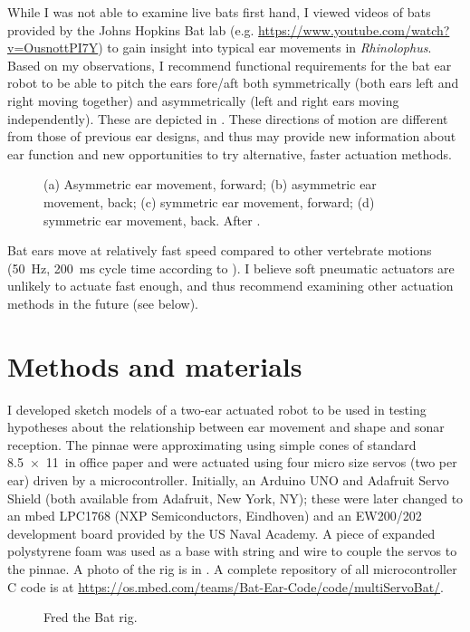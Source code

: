 \documentclass{article}
\begin{document}
While I was not able to examine live bats first hand, I viewed videos of bats provided by the Johns Hopkins Bat lab (e.g. \url{https://www.youtube.com/watch?v=OusnottPI7Y}) to gain insight into typical ear movements in \emph{Rhinolophus}. Based on my observations, I recommend functional requirements for the bat ear robot to be able to pitch the ears fore/aft both symmetrically (both ears left and right moving together) and asymmetrically (left and right ears moving independently). These are depicted in . These directions of motion are different from those of previous ear designs, and thus may provide new information about ear function and new opportunities to try alternative, faster actuation methods. 
\begin{figure}[h]
\caption{(a) Asymmetric ear movement, forward; (b) asymmetric ear movement, back; (c) symmetric ear movement, forward; (d) symmetric ear movement, back. After \citep{pannala2013investigation}.}
\label{fig:2}
\end{figure}

Bat ears move at relatively fast speed compared to other vertebrate motions (\SI{50}{\hertz}, \SI{200}{\milli\second} cycle time according to \cite{pannala2013interplay}). I believe soft pneumatic actuators are unlikely to actuate fast enough, and thus recommend examining other actuation methods \citep{hines2017soft} in the future (see below). 





\section{Methods and materials}
I developed sketch models of a two-ear actuated robot to be used in testing hypotheses about the relationship between ear movement and shape and sonar reception. The pinnae were approximating using simple cones of standard \SI{8.5x11}{in} office paper and were actuated using four micro size servos (two per ear) driven by a microcontroller. Initially, an Arduino UNO and Adafruit Servo Shield (both available from Adafruit, New York, NY); these were later changed to an mbed LPC1768 (NXP Semiconductors, Eindhoven) and an EW200/202 development board provided by the US Naval Academy. A piece of expanded polystyrene foam was used as a base with string and wire to couple the servos to the pinnae. A photo of the rig is in . A complete repository of all microcontroller C code is at \url{https://os.mbed.com/teams/Bat-Ear-Code/code/multiServoBat/}. 
\begin{figure}[h]
\begin{center}

\end{center}
\caption{Fred the Bat rig.}
\label{fig:3}
\end{figure}
\end{document}
